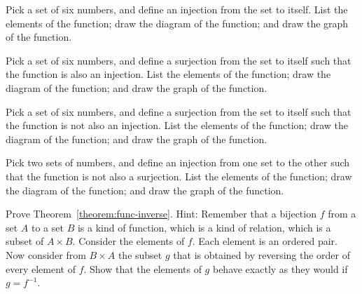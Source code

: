 \begin{exercise}
   Pick a set of six numbers, and define an injection from the set to itself.
   List the elements of the function; draw the diagram of the function; and
   draw the graph of the function.
\end{exercise}

\begin{exercise}
   Pick a set of six numbers, and define a surjection from the set to itself
   such that the function is also an injection.  List the elements of the
   function; draw the diagram of the function; and draw the graph of the
   function.
\end{exercise}

\begin{exercise}
   Pick a set of six numbers, and define a surjection from the set to itself
   such that the function is not also an injection.  List the elements of the
   function; draw the diagram of the function; and draw the graph of the
   function.
\end{exercise}

\begin{exercise}
   Pick two sets of numbers, and define an injection from one set to the other
   such that the function is not also a surjection.  List the elements of the
   function; draw the diagram of the function; and draw the graph of the
   function.
\end{exercise}

\begin{exercise}
   Prove Theorem~\ref{theorem:func-inverse}. Hint: Remember that a bijection
   $f$ from a set $A$ to a set $B$ is a kind of function, which is a kind of
   relation, which is a subset of $A \times B$. Consider the elements of $f$.
   Each element is an ordered pair. Now consider from $B \times A$ the subset
   $g$ that is obtained by reversing the order of every element of $f$. Show
   that the elements of $g$ behave exactly as they would if $g = f^{-1}$.
\end{exercise}

